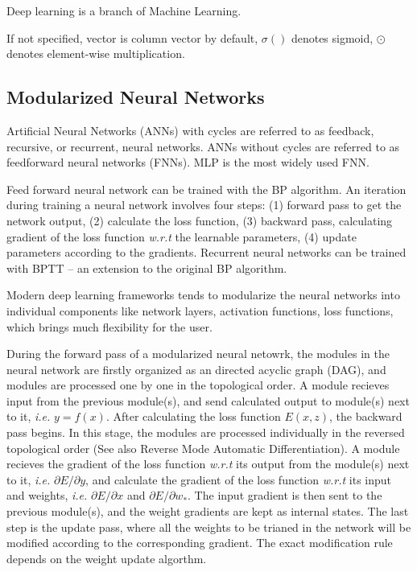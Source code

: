 
Deep learning is a branch of Machine Learning.

If not specified, vector is column vector by default,
$\sigma()$ denotes sigmoid, $\odot$ denotes element-wise multiplication.

\subsection{Modularized Neural Networks}

 Artificial Neural Networks (ANNs) with cycles are
 referred to as feedback, recursive, or recurrent,
 neural networks. ANNs without cycles are
 referred to as feedforward neural networks (FNNs).
 MLP is the most widely used FNN.

 Feed forward neural network can be trained with the
 BP algorithm. An iteration during training a neural network
 involves four steps: (1) forward pass to get the network output,
 (2) calculate the loss function, (3) backward pass, calculating
 gradient of the loss function {\it w.r.t} the learnable
 parameters, (4) update parameters according to the gradients.
 Recurrent neural networks can be trained with BPTT --
 an extension to the original BP algorithm.

 Modern deep learning frameworks tends to modularize the
 neural networks into individual components like network layers,
 activation functions, loss functions, which brings much
 flexibility for the user.

 During the forward pass of a modularized neural netowrk, the
 modules in the neural network are
 firstly organized as an directed acyclic graph (DAG), and modules
 are processed one by one in the topological order. A module
 recieves input from the previous module(s), and send calculated
 output to module(s) next to it, {\it i.e.} $y=f(x)$. After
 calculating the loss function $E(x,z)$, the backward pass begins.
 In this stage, the modules are processed individually in the
 reversed topological order (See also Reverse Mode Automatic
 Differentiation). A module recieves the gradient of the loss
 function {\it w.r.t} its output from the module(s) next to it,
 {\it i.e.} $\partial E/\partial y$, and calculate the gradient
 of the loss function {\it w.r.t} its input and weights, {\it i.e.}
 $\partial E/\partial x$ and $\partial E/\partial w_*$. The
 input gradient is then sent to the previous module(s), and
 the weight gradients are kept as internal states. The last step
 is the update pass, where all the weights to be trianed in the
 network will be modified according to the corresponding
 gradient. The exact modification rule depends on the weight 
 update algorthm.

